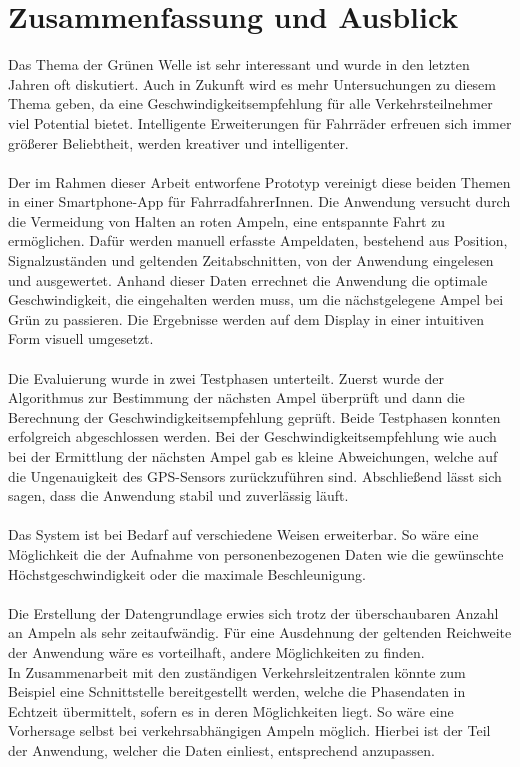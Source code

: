 \chapter{\label{chap:fazit}Zusammenfassung und Ausblick}
Das Thema der Grünen Welle ist sehr interessant und wurde in den letzten Jahren oft diskutiert. Auch in Zukunft wird es mehr Untersuchungen zu diesem Thema geben, da eine Geschwindigkeitsempfehlung für alle Verkehrsteilnehmer viel Potential bietet. Intelligente Erweiterungen für Fahrräder erfreuen sich immer größerer Beliebtheit, werden kreativer und intelligenter.\\\\
Der im Rahmen dieser Arbeit entworfene Prototyp vereinigt diese beiden Themen in einer \gls{Smartphone}-\gls{App} für FahrradfahrerInnen. Die Anwendung versucht durch die Vermeidung von Halten an roten Ampeln, eine entspannte Fahrt zu ermöglichen. Dafür werden manuell erfasste Ampeldaten, bestehend aus Position, Signalzuständen und geltenden Zeitabschnitten, von der Anwendung eingelesen und ausgewertet. Anhand dieser Daten errechnet die Anwendung die optimale Geschwindigkeit, die eingehalten werden muss, um die nächstgelegene Ampel bei Grün zu passieren. Die Ergebnisse werden auf dem Display in einer intuitiven Form visuell umgesetzt.\\\\ 
Die Evaluierung wurde in zwei Testphasen unterteilt. Zuerst wurde der Algorithmus zur Bestimmung der nächsten Ampel überprüft und dann die Berechnung der Geschwindigkeitsempfehlung geprüft. Beide Testphasen konnten erfolgreich abgeschlossen werden. Bei der Geschwindigkeitsempfehlung wie auch bei der Ermittlung der nächsten Ampel gab es kleine Abweichungen, welche auf die Ungenauigkeit des \gls{GPS}-Sensors zurückzuführen sind. Abschließend lässt sich sagen, dass die Anwendung stabil und zuverlässig läuft.\\\\
%
%
Das System ist bei Bedarf auf verschiedene Weisen erweiterbar. So wäre eine Möglichkeit die der Aufnahme von personenbezogenen Daten wie die gewünschte Höchstgeschwindigkeit oder die maximale Beschleunigung.\\\\
Die Erstellung der Datengrundlage erwies sich trotz der überschaubaren Anzahl an Ampeln als sehr zeitaufwändig. Für eine Ausdehnung der geltenden Reichweite der Anwendung wäre es vorteilhaft, andere Möglichkeiten zu finden.\\ 
In Zusammenarbeit mit den zuständigen Verkehrsleitzentralen könnte zum Beispiel eine Schnittstelle bereitgestellt werden, welche die Phasendaten in Echtzeit übermittelt, sofern es in deren Möglichkeiten liegt. So wäre eine Vorhersage selbst bei verkehrsabhängigen Ampeln möglich. Hierbei ist der Teil der Anwendung, welcher die Daten einliest, entsprechend anzupassen.\\
